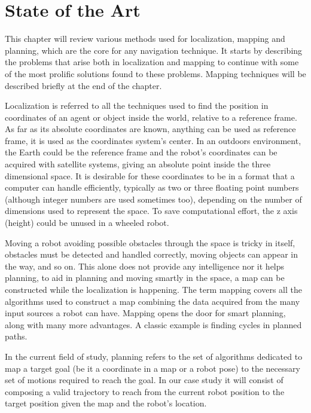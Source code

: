 \chapter{State of the Art} \label{ch_3:chapter}

  This chapter will review various methods used for localization, mapping and planning, which are the core for any navigation technique. It starts by describing the problems that arise both in localization and mapping to continue with some of the most prolific solutions found to these problems. Mapping techniques will be described briefly at the end of the chapter. 

  Localization is referred to all the techniques used to find the position in coordinates of an agent or object inside the world, relative to a reference frame. As far as its absolute coordinates are known, anything can be used as reference frame, it is used as the coordinates system's center. In an outdoors environment, the Earth could be the reference frame and the robot's coordinates can be acquired with satellite systems, giving an absolute point inside the three dimensional space. It is desirable for these coordinates to be in a format that a computer can handle efficiently, typically as two or three floating point numbers (although integer numbers are used sometimes too), depending on the number of dimensions used to represent the space. To save computational effort, the z axis (height) could be unused in a wheeled robot.

  Moving a robot avoiding possible obstacles through the space is tricky in itself, obstacles must be detected and handled correctly, moving objects can appear in the way, and so on. This alone does not provide any intelligence nor it helps planning, to aid in planning and moving smartly in the space, a map can be constructed while the localization is happening. The term mapping covers all the algorithms used to construct a map combining the data acquired from the many input sources a robot can have. Mapping opens the door for smart planning, along with many more advantages. A classic example is finding cycles in planned paths.
  
  In the current field of study, planning refers to the set of algorithms dedicated to map a target goal (be it a coordinate in a map or a robot pose) to the necessary set of motions required to reach the goal. In our case study it will consist of composing a valid trajectory to reach from the current robot position to the target position given the map and the robot's location.

